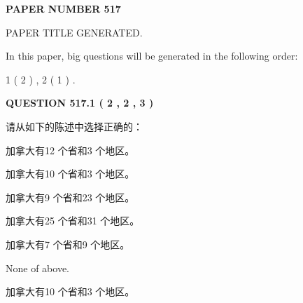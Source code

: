\documentclass{ctexart}
\begin{document}
   
   
   
\newpage 
\setcounter{page}{ 
   517001 } 
   
   
   
   
 {\textbf{ \Large{ PAPER NUMBER  517  }}}
   
   
\vspace{0.2in}
   
   
   
   
   
   
   
   
 \vspace{0.2in}
 
 
 
 
   
   
 PAPER TITLE GENERATED.
   
   
   
\vspace{0.2in}
   
In this paper, big questions will be generated in the following order: 
   
   
   1 ( 2 )
 ,
   2 ( 1 )
 .
  
\vspace{0.2in}
  
{\textbf{\Large{QUESTION
517.1 
 ( 2 , 2 , 3 )
}}}
  
  
请从如下的陈述中选择正确的：
 
 
加拿大有12 个省和3 个地区。
 
 
加拿大有10 个省和3 个地区。
 
 
加拿大有9 个省和23 个地区。
 
 
加拿大有25 个省和31 个地区。
 
 
加拿大有7 个省和9 个地区。
 
 
 None of above.
 
 
\noindent{}
 
 
加拿大有10 个省和3 个地区。
 
 
\noindent{}
 
 
   
   
   
\end{document}
